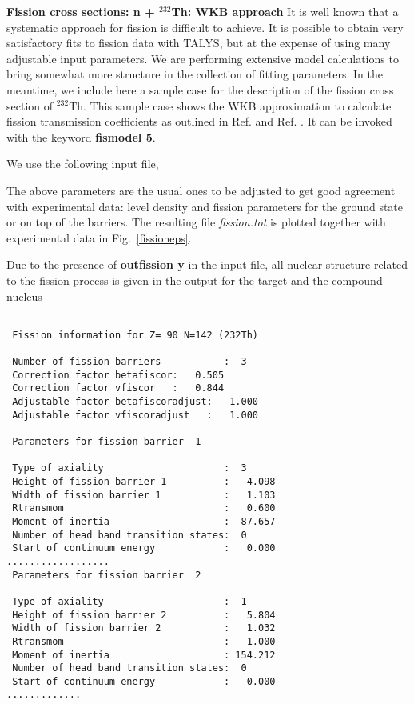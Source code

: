\begin{samplecase}
{\bf Fission cross sections: n + ${}^{232}$Th: WKB approach}\newline
It is well known that a systematic approach for fission is difficult to achieve.
It is possible to obtain
very satisfactory fits to fission data with TALYS, but at the expense of using
many adjustable input parameters.
We are performing extensive model calculations to bring somewhat more structure
in the collection of fitting parameters. In the meantime, we include here a
sample case for the description of the fission cross section of $^{232}$Th.
This sample case shows the
WKB approximation to calculate fission transmission coefficients as outlined in
Ref. \cite{Sin2006} and Ref. \cite{Goriely08}. It can be invoked
with the keyword {\bf fismodel 5}.

We use the following input file,


The above parameters are the usual ones to be adjusted to get good
agreement with experimental data: level density and fission parameters for
the ground state or on top of the barriers.
The resulting file {\em fission.tot} is plotted
together with experimental data in Fig.~\ref{fissioneps}.

Due to the presence of {\bf outfission y} in the input file, all nuclear
structure related to the fission process is given in the output for the target
and the compound nucleus
{\small \begin{verbatim}

 Fission information for Z= 90 N=142 (232Th)

 Number of fission barriers           :  3
 Correction factor betafiscor:   0.505
 Correction factor vfiscor   :   0.844
 Adjustable factor betafiscoradjust:   1.000
 Adjustable factor vfiscoradjust   :   1.000

 Parameters for fission barrier  1

 Type of axiality                     :  3
 Height of fission barrier 1          :   4.098
 Width of fission barrier 1           :   1.103
 Rtransmom                            :   0.600
 Moment of inertia                    :  87.657
 Number of head band transition states:  0
 Start of continuum energy            :   0.000
..................
 Parameters for fission barrier  2

 Type of axiality                     :  1
 Height of fission barrier 2          :   5.804
 Width of fission barrier 2           :   1.032
 Rtransmom                            :   1.000
 Moment of inertia                    : 154.212
 Number of head band transition states:  0
 Start of continuum energy            :   0.000
.............
\end{verbatim} } \renewcommand{\baselinestretch}{1.07}\small\normalsize
\noindent


\end{samplecase}
